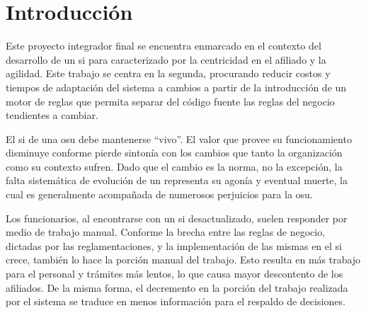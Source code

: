 \section{Introducción}\label{sec:intro}

Este proyecto integrador final se encuentra enmarcado en el contexto del desarrollo de un \acrfull{si} para  caracterizado por la centricidad en el afiliado y la agilidad. 
Este trabajo se centra en la segunda, procurando reducir costos y tiempos de adaptación del sistema a cambios a partir de la introducción de un motor de reglas que permita separar del código fuente las reglas del negocio tendientes a cambiar.


El \acrshort{si} de una \acrshort{osu} debe mantenerse ``vivo''. 
El valor que provee su funcionamiento disminuye conforme pierde sintonía con los cambios que tanto la organización 
como su contexto sufren. 
Dado que el cambio es la norma, no la excepción, la falta sistemática de evolución de un {\SIOSU} representa su agonía y eventual muerte, la cual es generalmente acompañada de numerosos perjuicios para la \acrshort{osu}.

Los funcionarios, al encontrarse con un \acrshort{si} desactualizado, suelen responder por medio de trabajo manual. Conforme la brecha entre las reglas de negocio, dictadas por las reglamentaciones, y la implementación de las mismas en el \acrshort{si} crece, también lo hace la porción manual del trabajo. Esto resulta en más trabajo para el personal y trámites más lentos, lo que causa mayor descontento de los afiliados. De la misma forma, el decremento en la porción del trabajo realizada por el sistema se traduce en menos información para el respaldo de decisiones.


